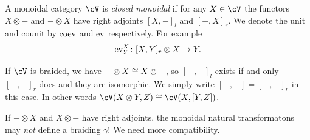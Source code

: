 \documentclass[a4paper,11pt,oneside,openany]{scrbook}
\begin{document}
\begin{defn}
    A monoidal category $ \cV $ is \emph{closed monoidal} if for any $ X \in \cV $ the functors $ X\otimes - $ and $ -\otimes X $ have right adjoints $ [X,-]_l $ and $ [-,X]_r $.
    We denote the unit and counit by $ \operatorname{coev} $ and $ \operatorname{ev} $ respectively.
    For example
    \begin{displaymath}
	\operatorname{ev}^X_Y \colon [X,Y]_r \otimes X \rightarrow Y.
    \end{displaymath}
\end{defn}
\begin{rmk}
    If $ \cV $ is braided, we have $ -\otimes X \cong X\otimes - $, so $ [-,-]_l $ exists if and only $ [-,-]_r $ does and they are isomorphic.
    We simply write $ [-,-] = [-,-]_r $ in this case.
    In other words $ \cV(X\otimes Y,Z)\iso \cV(X,[Y,Z]) $.
\end{rmk}

\begin{rmk}
    If $ -\otimes X $ and $ X\otimes - $ have right adjoints, the monoidal natural transformatons may \emph{not} define a braiding $ \gamma $!
    We need more compatibility.
\end{rmk}
\end{document}
